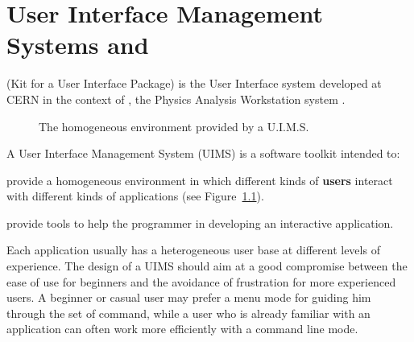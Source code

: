 
\chapter{User Interface Management Systems and \KUIP{}}
 
\KUIP{} (Kit for a User Interface Package) is the User
Interface system developed at CERN in the context of \PAW{},
the Physics Analysis Workstation system \cite{bib-PAW,bib-PAWART}.

\begin{figure}[tb]
\begin{center}
\mbox{}
\end{center}
\vspace{-.5cm} 
\caption{The homogeneous environment provided by a U.I.M.S.}
\label{FIG1}
\end{figure}

A User Interface Management System (UIMS) is a software toolkit intended to:
\begin{ULc}
\item
provide a homogeneous environment in which different kinds of
\textbf{users}
interact with different kinds of applications (see Figure~\ref{FIG1}).
\item
provide tools to help the programmer in developing an interactive
application.
\end{ULc}

Each application usually has a heterogeneous user base at different
levels of experience. 
The design of a UIMS should aim at a good compromise between the ease
of use for beginners and the avoidance of frustration for more experienced
users.
A beginner or casual user may prefer a menu mode for guiding him
through the set of command, while a user who is already familiar with
an application can often work more efficiently with a command line mode.

